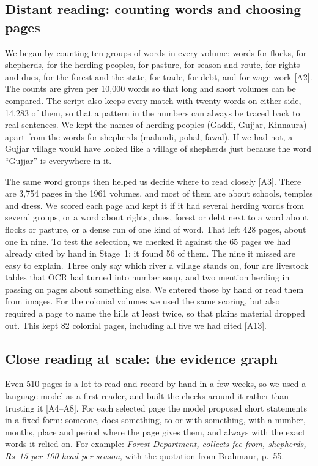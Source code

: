 \documentclass[10pt,a4paper,twocolumn]{article}
\newcommand{\entry}[1]{{\small\sffamily\color{muted}[#1]}}
\begin{document}
\subsection{Distant reading: counting words and choosing pages}

We began by counting ten groups of words in every volume: words for flocks, for shepherds, for the herding peoples, for pasture, for season and route, for rights and dues, for the forest and the state, for trade, for debt, and for wage work \entry{A2}. The counts are given per 10,000 words so that long and short volumes can be compared. The script also keeps every match with twenty words on either side, 14,283 of them, so that a pattern in the numbers can always be traced back to real sentences. We kept the names of herding peoples (Gaddi, Gujjar, Kinnaura) apart from the words for shepherds (malundi, pohal, fawal). If we had not, a Gujjar village would have looked like a village of shepherds just because the word ``Gujjar'' is everywhere in it.

The same word groups then helped us decide where to read closely \entry{A3}. There are 3,754 pages in the 1961 volumes, and most of them are about schools, temples and dress. We scored each page and kept it if it had several herding words from several groups, or a word about rights, dues, forest or debt next to a word about flocks or pasture, or a dense run of one kind of word. That left 428 pages, about one in nine. To test the selection, we checked it against the 65 pages we had already cited by hand in Stage~1: it found 56 of them. The nine it missed are easy to explain. Three only say which river a village stands on, four are livestock tables that OCR had turned into number soup, and two mention herding in passing on pages about something else. We entered those by hand or read them from images. For the colonial volumes we used the same scoring, but also required a page to name the hills at least twice, so that plains material dropped out. This kept 82 colonial pages, including all five we had cited \entry{A13}.

\subsection{Close reading at scale: the evidence graph}

Even 510 pages is a lot to read and record by hand in a few weeks, so we used a language model as a first reader, and built the checks around it rather than trusting it \entry{A4--A8}. For each selected page the model proposed short statements in a fixed form: someone, does something, to or with something, with a number, months, place and period where the page gives them, and always with the exact words it relied on. For example: \emph{Forest Department, collects fee from, shepherds, Rs~15 per 100 head per season}, with the quotation from Brahmaur, p.~55.
\end{document}

